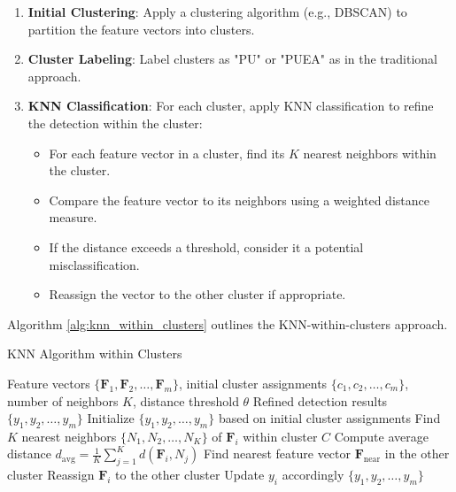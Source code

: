 \documentclass[conference]{IEEEtran}
\begin{document}
\begin{enumerate}
    \item \textbf{Initial Clustering}: Apply a clustering algorithm (e.g., DBSCAN) to partition the feature vectors into clusters.
    \item \textbf{Cluster Labeling}: Label clusters as "PU" or "PUEA" as in the traditional approach.
    \item \textbf{KNN Classification}: For each cluster, apply KNN classification to refine the detection within the cluster:
    \begin{itemize}
        \item For each feature vector in a cluster, find its $K$ nearest neighbors within the cluster.
        \item Compare the feature vector to its neighbors using a weighted distance measure.
        \item If the distance exceeds a threshold, consider it a potential misclassification.
        \item Reassign the vector to the other cluster if appropriate.
    \end{itemize}
\end{enumerate}

Algorithm \ref{alg:knn_within_clusters} outlines the KNN-within-clusters approach.

\begin{algorithm}
\caption{KNN Algorithm within Clusters}
\label{alg:knn_within_clusters}
\begin{algorithmic}[1]
\REQUIRE Feature vectors $\{\mathbf{F}_1, \mathbf{F}_2, \ldots, \mathbf{F}_m\}$, initial cluster assignments $\{c_1, c_2, \ldots, c_m\}$, number of neighbors $K$, distance threshold $\theta$
\ENSURE Refined detection results $\{y_1, y_2, \ldots, y_m\}$
\STATE Initialize $\{y_1, y_2, \ldots, y_m\}$ based on initial cluster assignments
        \STATE Find $K$ nearest neighbors $\{N_1, N_2, \ldots, N_K\}$ of $\mathbf{F}_i$ within cluster $C$
        \STATE Compute average distance $d_{\text{avg}} = \frac{1}{K}\sum_{j=1}^{K} d(\mathbf{F}_i, N_j)$
            \STATE Find nearest feature vector $\mathbf{F}_{\text{near}}$ in the other cluster
                \STATE Reassign $\mathbf{F}_i$ to the other cluster
                \STATE Update $y_i$ accordingly
            \ENDIF
        \ENDIF
    \ENDFOR
\ENDFOR
\RETURN $\{y_1, y_2, \ldots, y_m\}$
\end{algorithmic}
\end{algorithm}
\end{document}
